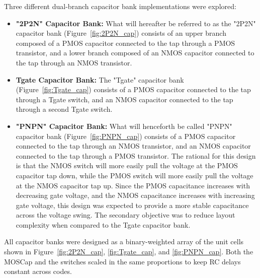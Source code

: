 Three different dual-branch capacitor bank implementations were explored:
\begin{itemize}
    \item \textbf{"2P2N" Capacitor Bank:} What will hereafter be referred to as the "2P2N" capacitor bank (Figure~\ref{fig:2P2N_cap}) consists of an upper branch composed of a PMOS capacitor connected to the tap through a PMOS transistor, and a lower branch composed of an NMOS capacitor connected to the tap through an NMOS transistor. 
    \item \textbf{Tgate Capacitor Bank:} The "Tgate" capacitor bank (Figure~\ref{fig:Tgate_cap}) consists of a PMOS capacitor connected to the tap through a Tgate switch, and an NMOS capacitor connected to the tap through a second Tgate switch.
    \item \textbf{"PNPN" Capacitor Bank:} What will henceforth be called "PNPN" capacitor bank (Figure~\ref{fig:PNPN_cap}) consists of a PMOS capacitor connected to the tap through an NMOS transistor, and an NMOS capacitor connected to the tap through a PMOS transistor. The rational for this design is that the NMOS switch will more easily pull the voltage at the PMOS capacitor tap down, while the PMOS switch will more easily pull the voltage at the NMOS capacitor tap up. Since the PMOS capacitance increases with decreasing gate voltage, and the NMOS capacitance increases with increasing gate voltage, this design was expected to provide a more stable capacitance across the voltage swing. The secondary objective was to reduce layout complexity when compared to the Tgate capacitor bank.
\end{itemize}
All capacitor banks were designed as a binary-weighted array of the unit cells shown in Figure~\ref{fig:2P2N_cap}, \ref{fig:Tgate_cap}, and \ref{fig:PNPN_cap}. Both the MOSCap and the switches scaled in the same proportions to keep RC delays constant across codes. 

